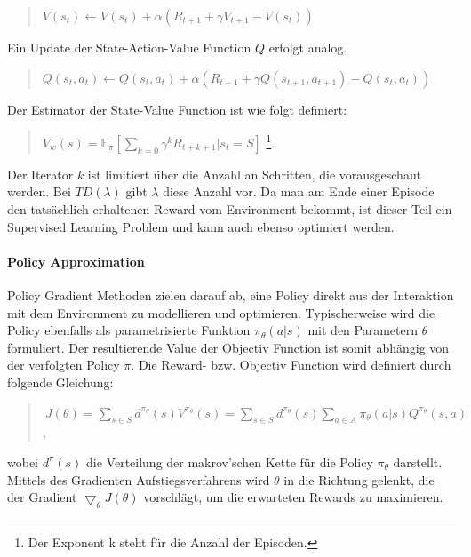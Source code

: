 \begin{quotation}
\centering
   \( V(s_t) \leftarrow V(s_t) + \alpha(R_{t+1} + \gamma V_{t+1} - V(s_t)) \) \\
\end{quotation} 
Ein Update der State-Action-Value Function $Q$ erfolgt analog. 

\begin{quotation}
\centering
   \( Q(s_t, a_t) \leftarrow Q(s_t, a_t) + \alpha(R_{t+1} + \gamma Q(s_{t+1}, a_{t+1}) - Q(s_t, a_t)) \) \\
\end{quotation}
 Der Estimator der State-Value Function ist wie folgt definiert:

\begin{quotation}
\centering
   \( V_w (s) = \mathbb{E}_{\pi} [ \sum\limits_{k = 0} \gamma^k R_{t+k+1} | s_t = S ] \) \footnote{Der Exponent k steht für die Anzahl der Episoden.}. \\
\end{quotation}
Der Iterator $k$ ist limitiert über die Anzahl an Schritten, die vorausgeschaut werden. Bei $TD(\lambda)$ gibt $\lambda$ diese Anzahl vor. Da man am Ende einer Episode den tatsächlich erhaltenen Reward vom Environment bekommt, ist dieser Teil ein Supervised Learning Problem und kann auch ebenso optimiert werden. 

\paragraph{Policy Approximation}
Policy Gradient Methoden zielen darauf ab, eine Policy direkt aus der Interaktion mit dem Environment zu modellieren und optimieren. Typischerweise wird die Policy ebenfalls als parametrisierte Funktion $\pi_{\theta}(a|s)$ mit den Parametern $\theta$ formuliert. Der resultierende Value der Objectiv Function ist somit abhängig von der verfolgten Policy $\pi$. Die Reward- bzw. Objectiv Function wird definiert durch folgende Gleichung:

\begin{quotation}
\centering
   \(\ J(\theta) = \sum\limits_{s \in S} d^{\pi_{\theta}}(s) V^{\pi_{\theta}}(s)  =  \sum\limits_{s \in S} d^{\pi_{\theta}}(s) \sum\limits_{a \in A} \pi_{\theta}(a|s) Q^{\pi_{\theta}}(s,a)   \) , \\
\end{quotation}
wobei $d^{\pi}(s)$ die Verteilung der makrov'schen Kette für die Policy $\pi_{\theta}$ darstellt. Mittels des Gradienten Aufstiegsverfahrens wird $\theta$ in die Richtung gelenkt, die der Gradient $\bigtriangledown_{\theta}J(\theta)$ vorschlägt, um die erwarteten Rewards zu maximieren.

